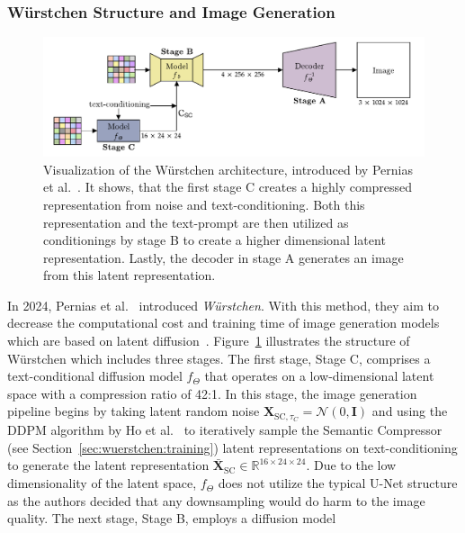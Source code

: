 \subsubsection{W\"urstchen Structure and Image Generation}
\begin{figure}[t]
    \includegraphics[width=\textwidth]{assets/wuerstchen_arch.pdf}
    \caption{Visualization of the W\"urstchen architecture, introduced by
        Pernias et al.~\cite{pernias2024wrstchen}. It shows, that the first stage C
        creates a highly compressed representation from noise and text-conditioning.
        Both this representation and the text-prompt are then utilized as conditionings by stage B
        to create a higher dimensional latent representation. Lastly, the decoder
        in stage A generates an image from this latent representation.}
    \label{fig:wuerstchen:arch}
\end{figure}
In 2024, Pernias et al.~\cite{pernias2024wrstchen} introduced \emph{W\"urstchen}.
With this method, they aim to decrease the computational cost and training
time of image generation models which are based on latent diffusion~\cite{rombach2022stablediffusion}.
Figure~\ref{fig:wuerstchen:arch} illustrates the structure of W\"urstchen which
includes three stages. The first stage, Stage C, comprises a
text-conditional diffusion model $f_\Theta$ that operates on a low-dimensional
latent space with a compression ratio of 42:1. In this stage, the image generation
pipeline begins by taking latent random noise
$\boldsymbol{X}_{\text{SC}, \tau_C} = \mathcal{N}(0, \boldsymbol{\text{I}})$ and
using the DDPM algorithm by Ho et al.~\cite{ho2020denoisingdiffusionprobabilisticmodels} to iteratively
sample the Semantic Compressor (see Section~\ref{sec:wuerstchen:training})
latent representations on text-conditioning to generate the latent representation
$\bar{\boldsymbol{X}}_{\text{SC}}\in\mathbb{R}^{16\times24\times24}$. Due to
the low dimensionality of the latent space, $f_\Theta$ does not utilize the
typical U-Net structure as the authors decided that any downsampling would do
harm to the image quality. The next stage, Stage B, employs a diffusion model
